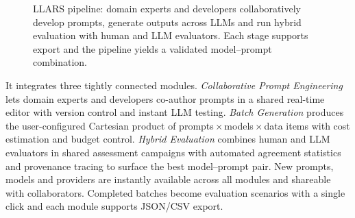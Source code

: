 \documentclass{article}
\begin{document}
\begin{figure}[htb]
\caption{LLARS pipeline: domain experts and developers collaboratively develop prompts, generate outputs across LLMs and run hybrid evaluation with human and LLM evaluators. Each stage supports export and the pipeline yields a validated model--prompt combination.}
\label{fig:pipeline}
\end{figure}

It integrates three tightly connected modules.
\emph{Collaborative Prompt Engineering} lets domain experts and developers co-author prompts in a shared real-time editor with version control and instant LLM testing.
\emph{Batch Generation} produces the user-configured Cartesian product of prompts\,$\times$\,models\,$\times$\,data items with cost estimation and budget control.
\emph{Hybrid Evaluation} combines human and LLM evaluators in shared assessment campaigns with automated agreement statistics and provenance tracing to surface the best model--prompt pair.
New prompts, models and providers are instantly available across all modules and shareable with collaborators. Completed batches become evaluation scenarios with a single click and each module supports JSON/CSV export.
\end{document}
